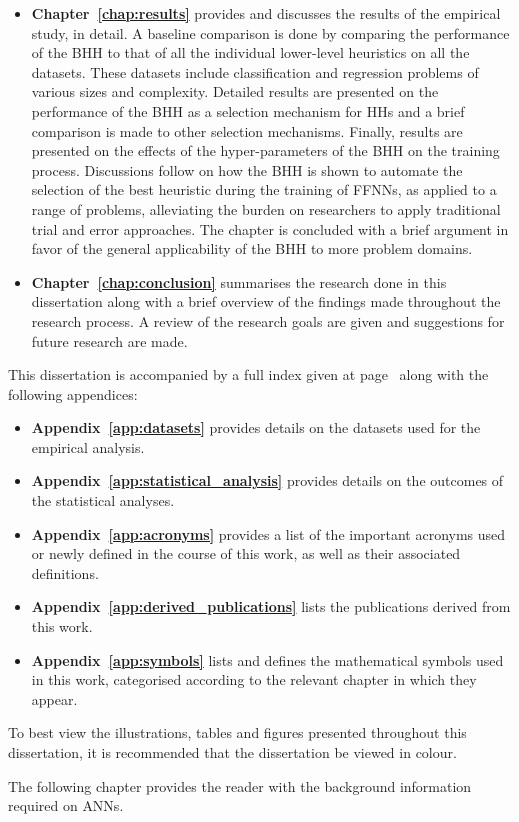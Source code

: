 \begin{itemize}
      \item \textbf{Chapter~\ref{chap:results}} provides and discusses the results of the empirical study, in detail. A baseline comparison is done by comparing the performance of the \Ac{BHH} to that of all the individual lower-level heuristics on all the datasets. These datasets include classification and regression problems of various sizes and complexity.  Detailed results are presented on the performance of the \Ac{BHH} as a selection mechanism for \acp{HH} and a brief comparison is made to other selection mechanisms. Finally, results are presented on the effects of the hyper-parameters of the \Ac{BHH} on the training process. Discussions follow on how the \Ac{BHH} is shown to automate the selection of the best heuristic during the training of \acp{FFNN}, as applied to a range of problems, alleviating the burden on researchers to apply traditional trial and error approaches. The chapter is concluded with a brief argument in favor of the general applicability of the \Ac{BHH} to more problem domains.

      \item \textbf{Chapter~\ref{chap:conclusion}} summarises the research done in this dissertation along with a brief overview of the findings made throughout the research process. A review of the research goals are given and suggestions for future research are made.
\end{itemize}

This dissertation is accompanied by a full index given at page~\pageref{index} along with the following appendices:

\begin{itemize}
      \item \textbf{Appendix~\ref{app:datasets}} provides details on the datasets used for the empirical analysis.

      \item \textbf{Appendix~\ref{app:statistical_analysis}} provides details on the outcomes of the statistical analyses.

      \item \textbf{Appendix~\ref{app:acronyms}} provides a list of the important acronyms used or newly defined in the course of this work, as well as their associated definitions.

      \item \textbf{Appendix~\ref{app:derived_publications}} lists the publications derived from this work.

      \item \textbf{Appendix~\ref{app:symbols}} lists and defines the mathematical symbols used in this work, categorised according to the relevant chapter in which they appear.
\end{itemize}

To best view the illustrations, tables and figures presented throughout this dissertation, it is recommended that the dissertation be viewed in colour.

The following chapter provides the reader with the background information required on \acp{ANN}.

